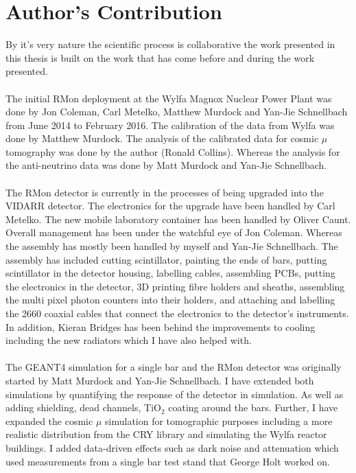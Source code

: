 \chapter{Author's Contribution}

By it's very nature the scientific process is collaborative the work presented in this thesis is built on the work that has come before and during the work presented. 
\\\\The initial RMon deployment at the Wylfa Magnox Nuclear Power Plant was done by Jon Coleman, Carl Metelko, Matthew Murdock and Yan-Jie Schnellbach from June 2014 to February 2016. The calibration of the data from Wylfa was done by Matthew Murdock. The analysis of the calibrated data for cosmic $\mu$ tomography was done by the author (Ronald Collins). Whereas the analysis for the anti-neutrino data was done by Matt Murdock and Yan-Jie Schnellbach. 
\\\\The RMon detector is currently in the processes of being upgraded into the VIDARR detector. The electronics for the upgrade have been handled by Carl Metelko. The new mobile laboratory container has been handled by Oliver Caunt. Overall management has been under the watchful eye of Jon Coleman. Whereas the assembly has mostly been handled by myself and Yan-Jie Schnellbach. The assembly has included cutting scintillator, painting the ends of bars, putting scintillator in the detector housing, labelling cables, assembling PCBs, putting the electronics in the detector, 3D printing fibre holders and sheaths, assembling the multi pixel photon counters into their holders, and attaching and labelling the 2660 coaxial cables that connect the electronics to the detector's instruments. In addition, Kieran Bridges has been behind the improvements to cooling including the new radiators which I have also helped with. 
\\\\The GEANT4 simulation for a single bar and the RMon detector was originally started by Matt Murdock and Yan-Jie Schnellbach. I have extended both simulations by quantifying the response of the detector in simulation. As well as adding shielding, dead channels, TiO$_2$ coating around the bars. Further, I have expanded the cosmic $\mu$  simulation for tomographic purposes including a more realistic distribution from the CRY library and simulating the Wylfa reactor buildings. I added data-driven effects such as dark noise and attenuation which used measurements from a single bar test stand that George Holt worked on. 
